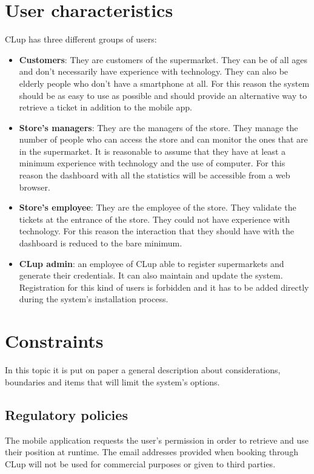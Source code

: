 \section{User characteristics}
CLup has three different groups of users:
\begin{itemize}
	\item \textbf{Customers}: They are customers of the supermarket. They can be of all ages and don't necessarily have experience with technology. They can also be elderly
	people who don't have a smartphone at all. For this reason the system should be as easy to use as possible and should provide an alternative way to retrieve a ticket in
	addition to the mobile app.
	\item \textbf{Store's managers}: They are the managers of the store. They manage the number of people who can access the store and can monitor the ones that
	are in the supermarket. It is reasonable to assume that they have at least a minimum experience with technology and the use of computer. For this reason the dashboard
	with all the statistics will be accessible from a web browser.
	\item \textbf{Store's employee}: They are the employee of the store. They validate the tickets at the entrance of the store. They could not have experience
	with technology. For this reason the interaction that they should have with the dashboard is reduced to the bare minimum.
    \item \textbf{CLup admin}: an employee of CLup able to register supermarkets and generate their credentials. It can also maintain and update the system. Registration for this kind of users is forbidden and it has to be added directly during the system's installation process.
\end{itemize}

\section{Constraints}
In this topic it is put on paper a general description about considerations, boundaries and items that will limit the system's options.

\subsection{Regulatory policies}
The mobile application requests the user's permission in order to retrieve and use their position at runtime. The email addresses provided when booking through CLup will not be used for commercial purposes or given to third parties.

